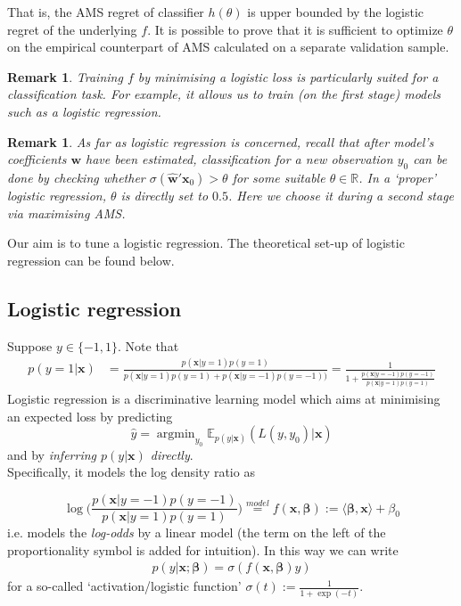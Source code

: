 \documentclass[]{article}
\DeclareMathOperator*{\argmin}{argmin}
\newcommand{\x}{\mathbf{x}}
\newcommand{\bbeta}{\boldsymbol \beta}
\newtheorem{remark}[theorem]{Remark}
\begin{document}
That is, the AMS regret of classifier $h(\theta)$ is upper bounded by the logistic regret of the underlying $f$. It is possible to prove that it is sufficient to optimize $\theta$ on the empirical counterpart of AMS calculated on a separate validation sample. 


\begin{remark}
Training $f$ by minimising a logistic loss is particularly suited for a classification task. For example, it allows us to train (on the first stage) models such as a logistic regression. 
\end{remark}
\begin{remark}
As far as logistic regression is concerned, recall that after model's coefficients $\bm{w}$ have been estimated, classification for a new observation $y_0$ can be done by checking whether  $\sigma(\hat{\bm{w}}'\bm{x}_0)>\theta$ for some suitable $\theta \in \mathbb{R}$. In a `proper' logistic regression, $\theta$ is directly set to $0.5$. Here we choose it during a second stage via maximising AMS.
\end{remark}

Our aim is to tune a logistic regression. The theoretical set-up of logistic regression can be found below.

\subsection{Logistic regression}


Suppose $y\in \{-1,1\}$. Note that
\begin{align}
p(y=1|\x)&=\frac{p(\x|y=1)p(y=1)}{p(\x|y=1)p(y=1)+p(\x|y=-1)p(y=-1))} = \frac{1}{1+\frac{p(\x|y=-1)p(y=-1)}{p(\x|y=1)p(y=1)}}
\end{align}
Logistic regression \cite{hastie2009elements} is a discriminative learning model which aims at minimising an expected loss by predicting 
$$\hat{y}=\argmin_{y_0}\mathbb{E}_{p(y|\x)}(L(y,y_0)|\x)$$
and by \textit{inferring $p(y|\x)$ directly}. \\


\noindent Specifically, it models the log density ratio as 

$$\log\Big(\frac{p(\x|y=-1)p(y=-1)}{p(\x|y=1)p(y=1)}\Big)\overset{model}{=}f(\x,\bbeta):=\langle \bbeta,\x \rangle+\beta_0$$ 
i.e. models the \textit{log-odds}  by a linear model (the term on the left of the proportionality symbol is added for intuition). In this way we can write 
\begin{align}
p(y|\x;\bbeta)=\sigma(f(\x,\bbeta)y)
\end{align}
for a so-called `activation/logistic function' $\sigma(t):=\frac{1}{1+\exp(-t)}$.  \\
\end{document}
